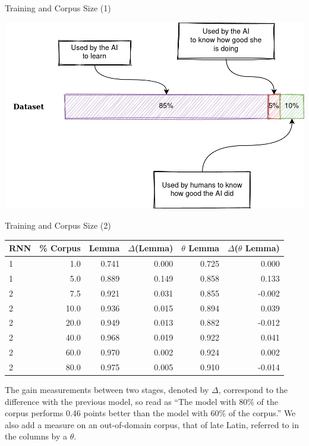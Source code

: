 \documentclass[aspectratio=169]{beamer}
\begin{document}
\begin{frame}{Training and Corpus Size (1)}

    \begin{center}
        \includegraphics[width=\linewidth,height=0.8\textheight,keepaspectratio]{nlp-for-ch/images/lemma-dataset.png}
    \end{center}

\end{frame}

\begin{frame}{Training and Corpus Size (2)}

    \begin{table}[]
        \centering
        \begin{tabular}{lr|rrrr}
        \toprule
         RNN &  \% Corpus &  Lemma &  $\Delta$(Lemma) &  $\theta$ Lemma &  $\Delta$($\theta$ Lemma) \\
        \midrule
           1 &     1.0 &  0.741  &     0.000 &    0.725 &       0.000 \\
           1 &     5.0 &  0.889  &     0.149 &    0.858 &       0.133 \\
           2 &     7.5 &  0.921  &     0.031 &    0.855 &      -0.002 \\
           2 &     10.0 &  0.936 &     0.015 &    0.894 &       0.039 \\
           2 &     20.0 &  0.949 &     0.013 &    0.882 &      -0.012 \\
           2 &     40.0 &  0.968 &     0.019 &    0.922 &       0.041 \\
           2 &     60.0 &  0.970 &     0.002 &    0.924 &       0.002 \\
           2 &     80.0 &  0.975 &     0.005 &    0.910 &      -0.014 \\
        \bottomrule
        \end{tabular}
    \end{table}
    
    
    \small The gain measurements between two stages, denoted by $\Delta$, correspond to the difference with the previous model, so read as “The model with 80\% of the corpus performs 0.46 points better than the model with 60\% of the corpus.” We also add a measure on an out-of-domain corpus, that of late Latin, referred to in the columns by a $\theta$.

\end{frame}
\end{document}

